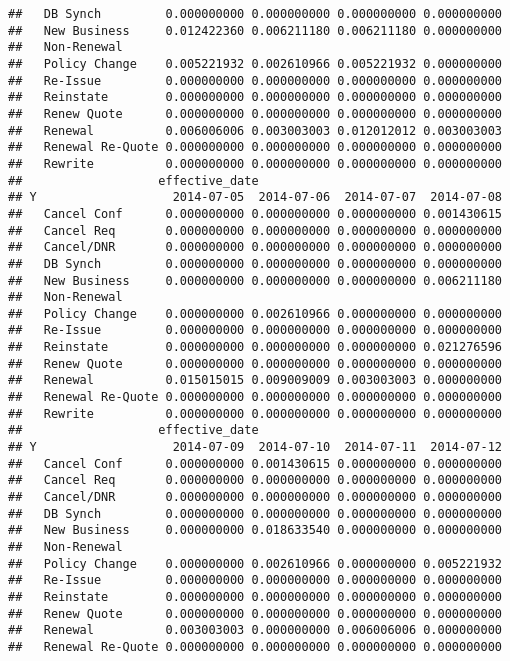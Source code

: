 \documentclass[]{article}
\begin{document}
\begin{verbatim}
##   DB Synch         0.000000000 0.000000000 0.000000000 0.000000000
##   New Business     0.012422360 0.006211180 0.006211180 0.000000000
##   Non-Renewal                                                     
##   Policy Change    0.005221932 0.002610966 0.005221932 0.000000000
##   Re-Issue         0.000000000 0.000000000 0.000000000 0.000000000
##   Reinstate        0.000000000 0.000000000 0.000000000 0.000000000
##   Renew Quote      0.000000000 0.000000000 0.000000000 0.000000000
##   Renewal          0.006006006 0.003003003 0.012012012 0.003003003
##   Renewal Re-Quote 0.000000000 0.000000000 0.000000000 0.000000000
##   Rewrite          0.000000000 0.000000000 0.000000000 0.000000000
##                   effective_date
## Y                   2014-07-05  2014-07-06  2014-07-07  2014-07-08
##   Cancel Conf      0.000000000 0.000000000 0.000000000 0.001430615
##   Cancel Req       0.000000000 0.000000000 0.000000000 0.000000000
##   Cancel/DNR       0.000000000 0.000000000 0.000000000 0.000000000
##   DB Synch         0.000000000 0.000000000 0.000000000 0.000000000
##   New Business     0.000000000 0.000000000 0.000000000 0.006211180
##   Non-Renewal                                                     
##   Policy Change    0.000000000 0.002610966 0.000000000 0.000000000
##   Re-Issue         0.000000000 0.000000000 0.000000000 0.000000000
##   Reinstate        0.000000000 0.000000000 0.000000000 0.021276596
##   Renew Quote      0.000000000 0.000000000 0.000000000 0.000000000
##   Renewal          0.015015015 0.009009009 0.003003003 0.000000000
##   Renewal Re-Quote 0.000000000 0.000000000 0.000000000 0.000000000
##   Rewrite          0.000000000 0.000000000 0.000000000 0.000000000
##                   effective_date
## Y                   2014-07-09  2014-07-10  2014-07-11  2014-07-12
##   Cancel Conf      0.000000000 0.001430615 0.000000000 0.000000000
##   Cancel Req       0.000000000 0.000000000 0.000000000 0.000000000
##   Cancel/DNR       0.000000000 0.000000000 0.000000000 0.000000000
##   DB Synch         0.000000000 0.000000000 0.000000000 0.000000000
##   New Business     0.000000000 0.018633540 0.000000000 0.000000000
##   Non-Renewal                                                     
##   Policy Change    0.000000000 0.002610966 0.000000000 0.005221932
##   Re-Issue         0.000000000 0.000000000 0.000000000 0.000000000
##   Reinstate        0.000000000 0.000000000 0.000000000 0.000000000
##   Renew Quote      0.000000000 0.000000000 0.000000000 0.000000000
##   Renewal          0.003003003 0.000000000 0.006006006 0.000000000
##   Renewal Re-Quote 0.000000000 0.000000000 0.000000000 0.000000000

\end{verbatim}
\end{document}
